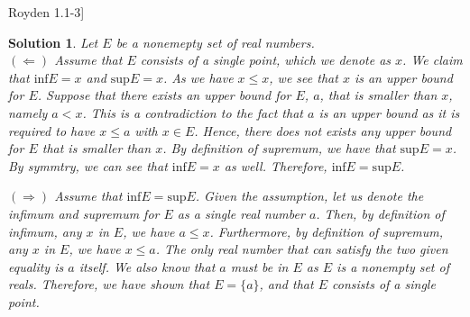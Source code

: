 \documentclass{article} %
\def\Qb#1\Qe{\begin{question}#1\end{question}}
\theoremstyle{quest}
\newtheorem*{question}{Question}
\newtheorem*{solution}{Solution}
\begin{document}
\Qb[Royden 1.1-3]
\Qe
\begin{solution}
Let $E$ be a nonemepty set of real numbers.\\ 
$\mathbf{( \Leftarrow )}$ Assume that 
$E$ consists of a single point, which we denote as $x$. We claim that
$\text{inf}E = x$ and $\text{sup}E = x$. As we have $x \leq x$, we see that $x$ is an upper bound
for $E$. Suppose that there exists an upper bound for $E$, $a$, that is smaller than $x$, namely 
$a < x$. This is a contradiction to the fact that $a$ is an upper bound as it is required to have
$x \leq a$ with $x \in E$. Hence, there does not exists any upper bound for $E$ that is smaller than
$x$. By definition of supremum, we have that $\text{sup}E = x$. By symmtry, we can see that
$\text{inf}E = x$ as well. Therefore, $\text{inf}E = \text{sup}E$. \\ 

\smallskip

$\mathbf{( \Rightarrow )}$ Assume that $\text{inf} E = \text{sup} E$. 
Given the assumption, let us denote the infimum and supremum for $E$ as a
single real number $a$. Then, by definition of infimum, any $x$ in $E$, we have
$a \leq x$. Furthermore, by definition of supremum, any $x$ in $E$, we have $x \leq a$.
The only real number that can satisfy the two given equality is $a$ itself. We also know
that $a$ must be in $E$ as $E$ is a nonempty set of reals. Therefore, 
we have shown that $E = \{ a \}$, and that $E$ consists of a single point.
\end{solution}
\end{document}
